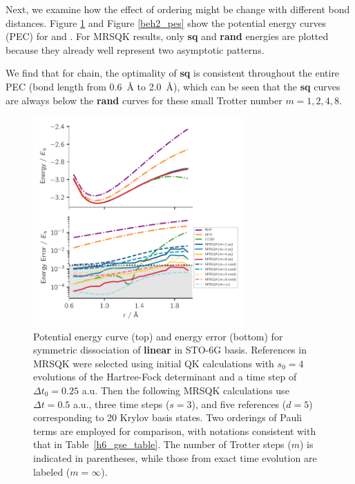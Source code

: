 \documentclass[journal=jctcce,manuscript=article]{achemso}
\newcommand{\methodabbr}[0]{MRSQK\xspace}
\begin{document}
Next, we examine how the effect of ordering might be change with different bond distances. Figure \ref{h6_pes} and Figure \ref{beh2_pes} show the potential energy curves (PEC) for  and . For \methodabbr results, only \textbf{sq} and \textbf{rand} energies are plotted because they already well represent two asymptotic patterns.

We find that for  chain, the optimality of \textbf{sq} is consistent throughout the entire PEC (bond length from 0.6~\AA{}  to 2.0~\AA), which can be seen that the \textbf{sq} curves are always below the \textbf{rand} curves for these small Trotter number $m=1, 2, 4, 8$.
\begin{figure}[h!]
  \centering
  \includegraphics[width=3.2in]{figs/H6_pes_error.pdf}
  \caption{Potential energy curve (top) and energy error (bottom) for symmetric dissociation of \textbf{linear } in STO-6G basis.
  References in \methodabbr were selected using initial QK calculations with $s_0 = 4$ evolutions of the Hartree-Fock determinant and a time step of $ \Delta t_0 = 0.25$ a.u.
  Then the following \methodabbr calculations use $ \Delta t = 0.5$ a.u., three time steps ($s=3$), and five references ($d=5$) corresponding to 20 Krylov basis states. 
  Two orderings of Pauli terms are employed for comparison, with notations consistent with that in Table~\ref{h6_gse_table}.
  The number of Trotter steps ($m$) is indicated in parentheses, while those from exact time evolution are labeled ($m = \infty$).
   }
\label{h6_pes}
\end{figure}
\end{document}

